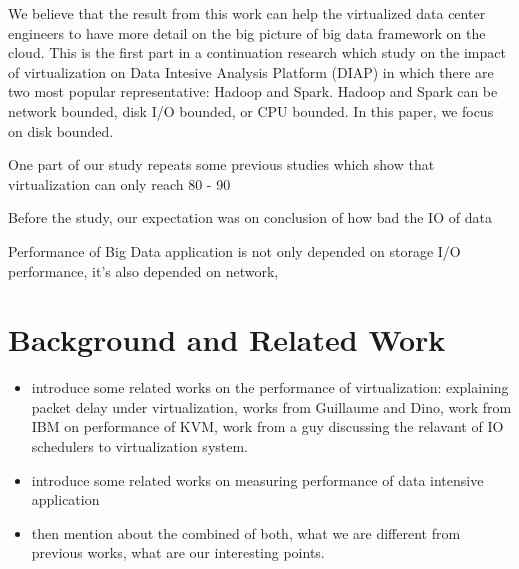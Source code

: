\documentclass{acmsig}
\begin{document}


We believe that the result from this work can help the virtualized data center engineers to have more detail on the big picture of big data framework on the cloud. This is the first part in a continuation research which study on the impact of virtualization on Data Intesive Analysis Platform (DIAP) in which there are two most popular representative: Hadoop and Spark. Hadoop and Spark can be network bounded, disk I/O bounded, or CPU bounded. In this paper, we focus on disk bounded.

One part of our study repeats some previous studies which show that virtualization can only reach 80 - 90%

Before the study, our expectation was on conclusion of how bad the IO of data %

Performance of Big Data application is not only depended on storage I/O performance, it's also depended on network,  %


\section{Background and Related Work}
\begin{itemize}
  \item introduce some related works on the performance of virtualization: explaining packet delay under virtualization, works from Guillaume and Dino, work from IBM on performance of KVM, work from a guy discussing the relavant of IO schedulers to virtualization system.
  \item introduce some related works on measuring performance of data intensive application
 \item then mention about the combined of both, what we are different from previous works, what are our interesting points.
\end{itemize}
\end{document}
